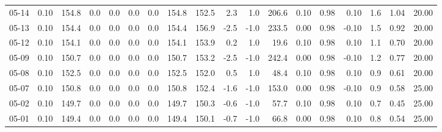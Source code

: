 \begin{threeparttable}
{\begin{tabular}{lrrrrrrrrrrrrrrrrr}
  05-14 &     0.10 & 154.8 &               0.0 &               0.0 &                0.0 &                0.0 & 154.8 & 152.5 &        2.3 &                      1.0 &               206.6 &       0.10 &      0.98 &           0.10 &              1.6 &            1.04 &                  20.00 \\
  05-13 &     0.10 & 154.4 &               0.0 &               0.0 &                0.0 &                0.0 & 154.4 & 156.9 &       -2.5 &                     -1.0 &               233.5 &       0.00 &      0.98 &          -0.10 &              1.5 &            0.92 &                  20.00 \\
  05-12 &     0.10 & 154.1 &               0.0 &               0.0 &                0.0 &                0.0 & 154.1 & 153.9 &        0.2 &                      1.0 &                19.6 &       0.10 &      0.98 &           0.10 &              1.1 &            0.70 &                  20.00 \\
  05-09 &     0.10 & 150.7 &               0.0 &               0.0 &                0.0 &                0.0 & 150.7 & 153.2 &       -2.5 &                     -1.0 &               242.4 &       0.00 &      0.98 &          -0.10 &              1.2 &            0.77 &                  20.00 \\
  05-08 &     0.10 & 152.5 &               0.0 &               0.0 &                0.0 &                0.0 & 152.5 & 152.0 &        0.5 &                      1.0 &                48.4 &       0.10 &      0.98 &           0.10 &              0.9 &            0.61 &                  20.00 \\
  05-07 &     0.10 & 150.8 &               0.0 &               0.0 &                0.0 &                0.0 & 150.8 & 152.4 &       -1.6 &                     -1.0 &               153.0 &       0.00 &      0.98 &          -0.10 &              0.9 &            0.58 &                  25.00 \\
  05-02 &     0.10 & 149.7 &               0.0 &               0.0 &                0.0 &                0.0 & 149.7 & 150.3 &       -0.6 &                     -1.0 &                57.7 &       0.10 &      0.98 &           0.10 &              0.7 &            0.45 &                  25.00 \\
  05-01 &     0.10 & 149.4 &               0.0 &               0.0 &                0.0 &                0.0 & 149.4 & 150.1 &       -0.7 &                     -1.0 &                66.8 &       0.00 &      0.98 &           0.10 &              0.8 &            0.54 &                  25.00 \\

\end{tabular}}
\end{threeparttable}
